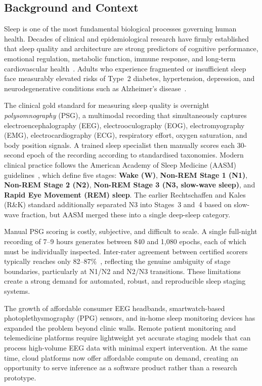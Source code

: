 \documentclass[10pt]{article}
\begin{document}
\subsection{Background and Context}
\label{sec:background}

Sleep is one of the most fundamental biological processes governing human health. Decades of clinical and epidemiological research have firmly established that sleep quality and architecture are strong predictors of cognitive performance, emotional regulation, metabolic function, immune response, and long-term cardiovascular health~\cite{walker2017why}. Adults who experience fragmented or insufficient sleep face measurably elevated risks of Type~2 diabetes, hypertension, depression, and neurodegenerative conditions such as Alzheimer's disease~\cite{cappuccio2010sleep}.

The clinical gold standard for measuring sleep quality is overnight \textit{polysomnography} (PSG), a multimodal recording that simultaneously captures electroencephalography (EEG), electrooculography (EOG), electromyography (EMG), electrocardiography (ECG), respiratory effort, oxygen saturation, and body position signals. A trained sleep specialist then manually scores each 30-second epoch of the recording according to standardised taxonomies. Modern clinical practice follows the American Academy of Sleep Medicine (AASM) guidelines~\cite{berry2012aasm}, which define five stages: \textbf{Wake (W)}, \textbf{Non-REM Stage 1 (N1)}, \textbf{Non-REM Stage 2 (N2)}, \textbf{Non-REM Stage 3 (N3, slow-wave sleep)}, and \textbf{Rapid Eye Movement (REM) sleep}. The earlier Rechtschaffen and Kales (R\&K) standard additionally separated N3 into Stages~3 and~4 based on slow-wave fraction, but AASM merged these into a single deep-sleep category.

Manual PSG scoring is costly, subjective, and difficult to scale. A single full-night recording of 7--9 hours generates between 840 and 1,080 epochs, each of which must be individually inspected. Inter-rater agreement between certified scorers typically reaches only 82--87\%~\cite{danker2009inter}, reflecting the genuine ambiguity of stage boundaries, particularly at N1/N2 and N2/N3 transitions. These limitations create a strong demand for automated, robust, and reproducible sleep staging systems.

The growth of affordable consumer EEG headbands, smartwatch-based photoplethysmography (PPG) sensors, and in-home sleep monitoring devices has expanded the problem beyond clinic walls. Remote patient monitoring and telemedicine platforms require lightweight yet accurate staging models that can process high-volume EEG data with minimal expert intervention. At the same time, cloud platforms now offer affordable compute on demand, creating an opportunity to serve inference as a software product rather than a research prototype.
\end{document}
